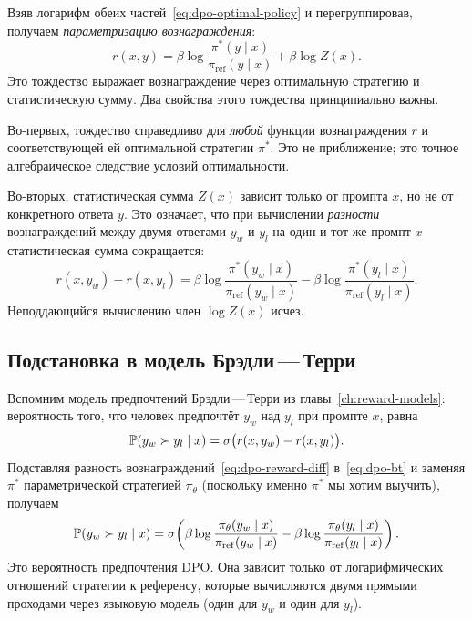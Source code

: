 Взяв логарифм обеих частей~\eqref{eq:dpo-optimal-policy} и перегруппировав, получаем \emph{параметризацию вознаграждения}:
\begin{equation}
\label{eq:dpo-reparam}
r(x, y) = \beta\log\frac{\pi^*(y \mid x)}{\pi_\mathrm{ref}(y \mid x)} + \beta\log Z(x).
\end{equation}
Это тождество выражает вознаграждение через оптимальную стратегию и статистическую сумму. Два свойства этого тождества принципиально важны.

Во-первых, тождество справедливо для \emph{любой} функции вознаграждения $r$ и соответствующей ей оптимальной стратегии $\pi^*$. Это не приближение; это точное алгебраическое следствие условий оптимальности.

Во-вторых, статистическая сумма $Z(x)$ зависит только от промпта $x$, но не от конкретного ответа $y$. Это означает, что при вычислении \emph{разности} вознаграждений между двумя ответами $y_w$ и $y_l$ на один и тот же промпт $x$ статистическая сумма сокращается:
\begin{equation}
\label{eq:dpo-reward-diff}
r(x, y_w) - r(x, y_l)
= \beta\log\frac{\pi^*(y_w \mid x)}{\pi_\mathrm{ref}(y_w \mid x)}
- \beta\log\frac{\pi^*(y_l \mid x)}{\pi_\mathrm{ref}(y_l \mid x)}.
\end{equation}
Неподдающийся вычислению член $\log Z(x)$ исчез.

\subsection{Подстановка в модель Брэдли\,---\,Терри}

Вспомним модель предпочтений Брэдли\,---\,Терри из главы~\ref{ch:reward-models}: вероятность того, что человек предпочтёт $y_w$ над $y_l$ при промпте $x$, равна
\begin{equation}
\label{eq:dpo-bt}
\mathbb{P}(y_w \succ y_l \mid x) = \sigma\bigl(r(x, y_w) - r(x, y_l)\bigr).
\end{equation}
Подставляя разность вознаграждений~\eqref{eq:dpo-reward-diff} в~\eqref{eq:dpo-bt} и заменяя $\pi^*$ параметрической стратегией $\pi_\theta$ (поскольку именно $\pi^*$ мы хотим выучить), получаем
\begin{equation}
\label{eq:dpo-pref-prob}
\mathbb{P}(y_w \succ y_l \mid x) = \sigma\!\left(\beta\log\frac{\pi_\theta(y_w \mid x)}{\pi_\mathrm{ref}(y_w \mid x)}
- \beta\log\frac{\pi_\theta(y_l \mid x)}{\pi_\mathrm{ref}(y_l \mid x)}\right).
\end{equation}
Это вероятность предпочтения DPO. Она зависит только от логарифмических отношений стратегии к референсу, которые вычисляются двумя прямыми проходами через языковую модель (один для $y_w$ и один для $y_l$).

